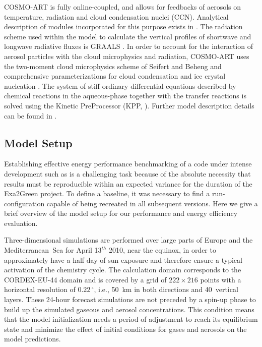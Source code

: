 COSMO-ART  is  fully  online-coupled,  and  allows  for  feedbacks  of
aerosols  on  temperature,  radiation  and cloud  condensation  nuclei
(CCN).   Analytical  description  of  modules  incorporated  for  this
purpose  exists  in  \cite{Vogel-2009, Bangert-2011}.   The  radiation
scheme used  within the  model to calculate  the vertical  profiles of
shortwave and longwave  radiative fluxes is GRAALS \cite{Ritter-1992}.
In order to account for  the interaction of aerosol particles with the
cloud microphysics and radiation,  COSMO-ART uses the two-moment cloud
microphysics  scheme  of Seifert  and  Beheng \cite{Seifert-2006}  and
comprehensive parameterizations for cloud condensation and ice crystal
nucleation  \cite{Bangert-2011, Bangert-2012}.   The  system of  stiff
ordinary differential equations described by chemical reactions in the
aqueous-phase together with the transfer reactions is solved using the
Kinetic PreProcessor (KPP, \cite{Damian-2002}). Further model description details  can be found in \cite{Bangert-2012,
  Knote-2011, Knote-2013}.

\subsection{Model Setup}
\label{subsec:1.2}

Establishing effective energy performance benchmarking of a code under
intense development such as \cosmoart is a challenging task because of
the  absolute necessity that  results must  be reproducible  within an
expected variance  for the duration of the  Exa2Green pro\-je\-ct.  To
define  a  baseline, it  was  necessary  to  find a  run-configuration
capable of being recreated in all subsequent versions.  Here we give a
brief  overview of  the model  setup  for our  performance and  energy
efficiency evaluation.

Three-dimensional simulations are performed over large parts of Europe
and the Mediterranean~Sea for  April 13$^{th}$ 2010, near the equinox,
in  order  to  approximately have  a  half  day  of sun  exposure  and
therefore  ensure a typical  activation of  the chemistry  cycle.  The
calculation  domain  corresponds to  the  CORDEX-EU-44  domain and  is
covered  by  a  grid  of  $222\times 216$  points  with  a  horizontal
resolution  of $0.22\,^{\circ}$,  i.e., 50~km  in both  directions and
40~vertical  layers.   These  24-hour  forecast  simulations  are  not
preceded  by a spin-up  phase to  build up  the simulated  gaseous and
aerosol   concentrations.   This  condition   means  that   the  model
initialization needs  a period of adjustment to  reach its equilibrium
state  and minimize  the effect  of initial  conditions for  gases and
aerosols on the model predictions.

